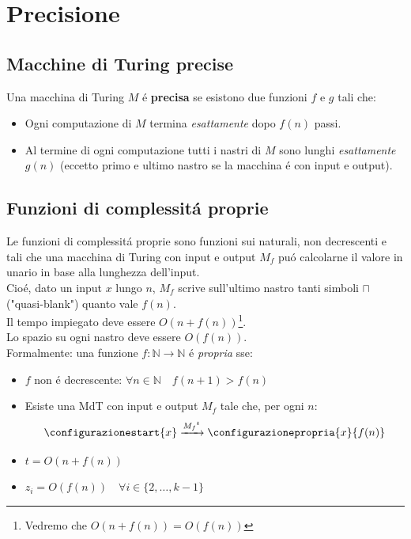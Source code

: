 \section{Precisione}

\subsection{Macchine di Turing precise}
Una macchina di Turing $M$ é \textbf{precisa} se esistono due funzioni $f$ e $g$ tali che:
\begin{itemize}
	\item Ogni computazione di $M$ termina \textit{esattamente} dopo $f(n)$ passi.
	\item Al termine di ogni computazione tutti i nastri di $M$ sono lunghi \textit{esattamente} $g(n)$ (eccetto primo e ultimo nastro se la macchina é con input e output).
\end{itemize}

\subsection{Funzioni di complessitá proprie}
Le funzioni di complessitá proprie sono funzioni sui naturali, non decrescenti e tali che una macchina di Turing con input e output $M_f$ puó calcolarne il valore in unario in base alla lunghezza dell'input. \\
Cioé, dato un input $x$ lungo $n$, $M_f$ scrive sull'ultimo nastro tanti simboli $\sqcap$ ("quasi-blank") quanto vale $f(n)$. \\
Il tempo impiegato deve essere $O(n + f(n))$\footnote{Vedremo che $O(n + f(n)) = O(f(n))$}. \\
Lo spazio su ogni nastro deve essere $O(f(n))$. \\
Formalmente: una funzione $f: \mathbb{N} \rightarrow \mathbb{N}$ é \textit{propria} sse:
\begin{itemize}
	\item $f$ non é decrescente: \quad $\forall n \in \mathbb{N} \quad f(n+1) > f(n)$
	\item Esiste una MdT con input e output $M_f$ tale che, per ogni $n$: \\
	\[
	\configurazionestart{x} \xrightarrow{{M_f}^t} \configurazionepropria{x}{f(n)}
	\]
	\item $t = O(n + f(n))$
	\item $z_i = O(f(n)) \quad \forall i \in \{2, \dots, k-1\}$
\end{itemize}

